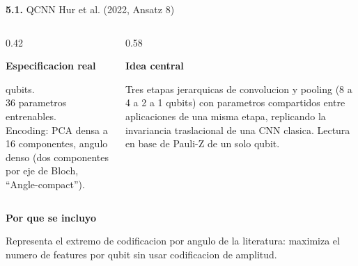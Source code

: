 \documentclass[aspectratio=169]{beamer}
\newcommand{\bmheading}[2]{\textbf{\color{#1}#2}\par\smallskip}
\newcommand{\subsec}[2]{\textbf{\color{bmIndigo}#1.} #2}
\begin{document}
\begin{frame}{\subsec{5.1}{QCNN Hur et al. (2022, Ansatz 8)}}
  \footnotesize
  \begin{columns}[T]
    \begin{column}{0.42\textwidth}
      \begin{bluebox}
        \bmheading{bmBlue}{Especificacion real}
        8 qubits.\\
        36 parametros entrenables.\\
        Encoding: PCA densa a 16 componentes, angulo denso (dos componentes por
        eje de Bloch, ``Angle-compact'').
      \end{bluebox}
    \end{column}
    \begin{column}{0.58\textwidth}
      \begin{indigobox}
        \bmheading{bmIndigo}{Idea central}
        Tres etapas jerarquicas de convolucion y pooling (8 a 4 a 2 a 1 qubits)
        con parametros compartidos entre aplicaciones de una misma etapa,
        replicando la invariancia traslacional de una CNN clasica. Lectura en
        base de Pauli-Z de un solo qubit.
      \end{indigobox}
    \end{column}
  \end{columns}
  \vspace{8pt}
  \begin{amberbox}
    \bmheading{bmAmber}{Por que se incluyo}
    Representa el extremo de codificacion por angulo de la literatura: maximiza
    el numero de features por qubit sin usar codificacion de amplitud.
  \end{amberbox}
\end{frame}
\end{document}
